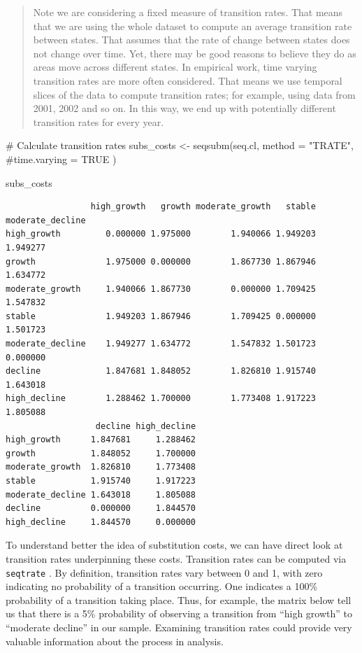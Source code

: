 \documentclass[
  letterpaper,
  DIV=11,
  numbers=noendperiod]{scrreprt}
\newenvironment{Shaded}{\begin{snugshade}}{\end{snugshade}}
\newcommand{\AttributeTok}[1]{\textcolor[rgb]{0.40,0.45,0.13}{#1}}
\newcommand{\CommentTok}[1]{\textcolor[rgb]{0.37,0.37,0.37}{#1}}
\newcommand{\FunctionTok}[1]{\textcolor[rgb]{0.28,0.35,0.67}{#1}}
\newcommand{\NormalTok}[1]{\textcolor[rgb]{0.00,0.23,0.31}{#1}}
\newcommand{\OtherTok}[1]{\textcolor[rgb]{0.00,0.23,0.31}{#1}}
\newcommand{\StringTok}[1]{\textcolor[rgb]{0.13,0.47,0.30}{#1}}
\begin{document}
\begin{quote}
Note we are considering a fixed measure of transition rates. That means
that we are using the whole dataset to compute an average transition
rate between states. That assumes that the rate of change between states
does not change over time. Yet, there may be good reasons to believe
they do as areas move across different states. In empirical work, time
varying transition rates are more often considered. That means we use
temporal slices of the data to compute transition rates; for example,
using data from 2001, 2002 and so on. In this way, we end up with
potentially different transition rates for every year.
\end{quote}

\begin{Shaded}
\begin{Highlighting}[]
\CommentTok{\# Calculate transition rates}
\NormalTok{subs\_costs }\OtherTok{\textless{}{-}} \FunctionTok{seqsubm}\NormalTok{(seq.cl, }
                      \AttributeTok{method =} \StringTok{"TRATE"}\NormalTok{,}
                      \CommentTok{\#time.varying = TRUE}
\NormalTok{                      )}

\NormalTok{subs\_costs}
\end{Highlighting}
\end{Shaded}

\begin{verbatim}
                 high_growth   growth moderate_growth   stable moderate_decline
high_growth         0.000000 1.975000        1.940066 1.949203         1.949277
growth              1.975000 0.000000        1.867730 1.867946         1.634772
moderate_growth     1.940066 1.867730        0.000000 1.709425         1.547832
stable              1.949203 1.867946        1.709425 0.000000         1.501723
moderate_decline    1.949277 1.634772        1.547832 1.501723         0.000000
decline             1.847681 1.848052        1.826810 1.915740         1.643018
high_decline        1.288462 1.700000        1.773408 1.917223         1.805088
                  decline high_decline
high_growth      1.847681     1.288462
growth           1.848052     1.700000
moderate_growth  1.826810     1.773408
stable           1.915740     1.917223
moderate_decline 1.643018     1.805088
decline          0.000000     1.844570
high_decline     1.844570     0.000000
\end{verbatim}

To understand better the idea of substitution costs, we can have direct
look at transition rates underpinning these costs. Transition rates can
be computed via \texttt{seqtrate} . By definition, transition rates vary
between 0 and 1, with zero indicating no probability of a transition
occurring. One indicates a 100\% probability of a transition taking
place. Thus, for example, the matrix below tell us that there is a 5\%
probability of observing a transition from ``high growth'' to ``moderate
decline'' in our sample. Examining transition rates could provide very
valuable information about the process in analysis.
\end{document}
